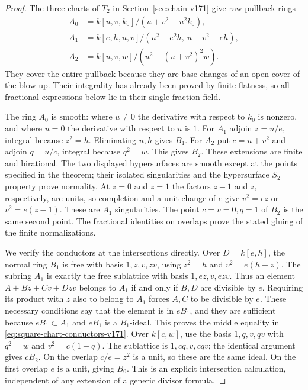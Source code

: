 \begin{proof}
The three charts of $T_2$ in Section~\ref{sec:chain-v171} give raw
pullback rings
\begin{align*}
 A_0&=k[u,v,k_0]/(u+v^2-u^2k_0),\\
 A_1&=k[e,h,u,v]/(u^2-e^2h,\ u+v^2-eh),\\
 A_2&=k[u,v,w]/(u^2-(u+v^2)^2w).
\end{align*}
They cover the entire pullback because they are base changes of an
open cover of the blow-up. Their integrality has already been proved
by finite flatness, so all fractional expressions below lie in their
single fraction field.

The ring $A_0$ is smooth: where $u\ne0$ the derivative with respect to
$k_0$ is nonzero, and where $u=0$ the derivative with respect to $u$
is $1$. For $A_1$ adjoin $z=u/e$, integral because $z^2=h$. Eliminating
$u,h$ gives $B_1$. For $A_2$ put $c=u+v^2$ and adjoin $q=u/c$,
integral because $q^2=w$. This gives $B_2$. These extensions are
finite and birational. The two displayed hypersurfaces are smooth
except at the points specified in the theorem; their isolated
singularities and the hypersurface $S_2$ property prove normality.
At $z=0$ and $z=1$ the factors $z-1$ and $z$, respectively, are units,
so completion and a unit change of $e$ give $v^2=ez$ or $v^2=e(z-1)$.
These are $A_1$ singularities. The point $c=v=0,q=1$ of $B_2$ is the
same second point. The fractional identities on overlaps prove the
stated gluing of the finite normalizations.

We verify the conductors at the intersections directly. Over
$D=k[e,h]$, the normal ring $B_1$ is free with basis
$1,z,v,zv$, using $z^2=h$ and $v^2=e(h-z)$. The subring $A_1$ is
exactly the free sublattice with basis $1,ez,v,ezv$. Thus an element
$A+Bz+Cv+Dzv$ belongs to $A_1$ if and only if $B,D$ are divisible by
$e$. Requiring its product with $z$ also to belong to $A_1$ forces
$A,C$ to be divisible by $e$. These necessary conditions say that
the element is in $eB_1$, and they are sufficient because
$eB_1\subset A_1$ and $eB_1$ is a $B_1$-ideal. This proves the
middle equality in \eqref{eq:square-chart-conductors-v171}.
Over $k[c,w]$, use the basis $1,q,v,qv$ with $q^2=w$ and
$v^2=c(1-q)$. The sublattice is $1,cq,v,cqv$; the identical argument
gives $cB_2$. On the overlap $c/e=z^2$ is a unit, so these are the
same ideal. On the first overlap $e$ is a unit, giving $B_0$.
This is an explicit intersection calculation, independent of any
extension of a generic divisor formula.


\end{proof}
